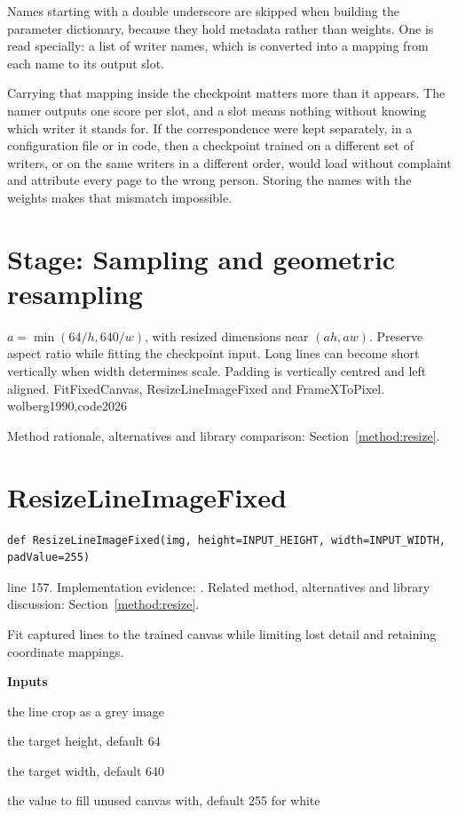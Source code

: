 Names starting with a double underscore are skipped when building the parameter dictionary, because they hold metadata rather than weights. One is read specially: a list of writer names, which is converted into a mapping from each name to its output slot.

Carrying that mapping inside the checkpoint matters more than it appears. The namer outputs one score per slot, and a slot means nothing without knowing which writer it stands for. If the correspondence were kept separately, in a configuration file or in code, then a checkpoint trained on a different set of writers, or on the same writers in a different order, would load without complaint and attribute every page to the wrong person. Storing the names with the weights makes that mismatch impossible.



\section*{Stage: Sampling and geometric resampling}
{$a=\min(64/h,640/w)$, with resized dimensions near $(ah,aw)$.}
{Preserve aspect ratio while fitting the checkpoint input. Long lines can
become short vertically when width determines scale. Padding is vertically
centred and left aligned.}
{FitFixedCanvas, ResizeLineImageFixed and FrameXToPixel.}
{wolberg1990,code2026}


Method rationale, alternatives and library comparison: Section~\ref{method:resize}.
\section{ResizeLineImageFixed}\label{fn:recognise:ResizeLineImageFixed}
\begin{lstlisting}[style=sig]
def ResizeLineImageFixed(img, height=INPUT_HEIGHT, width=INPUT_WIDTH, padValue=255)
\end{lstlisting}
 line 157. Implementation evidence: \cite{code2026}. Related method, alternatives and library discussion: Section~\ref{method:resize}.


Fit captured lines to the trained canvas while limiting lost detail and retaining coordinate mappings.




\noindent\textbf{Inputs}
\begin{description}[leftmargin=2.2em,style=nextline,font=\normalfont\ttfamily]\setlength\itemsep{1pt}
  \item[{img}] \normalfont the line crop as a grey image
  \item[{height}] \normalfont the target height, default 64
  \item[{width}] \normalfont the target width, default 640
  \item[{padValue}] \normalfont the value to fill unused canvas with, default 255 for white
\end{description}

